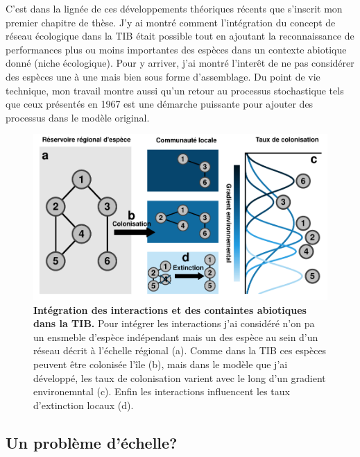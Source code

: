 C'est dans la lignée de ces développements théoriques récents que
s'inscrit mon premier chapitre de thèse. J'y ai montré comment
l'intégration du concept de réseau écologique dans la TIB était possible
tout en ajoutant la reconnaissance de performances plus ou moins
importantes des espèces dans un contexte abiotique donné (niche
écologique). Pour y arriver, j'ai montré l'interêt de ne pas considérer
des espèces une à une mais bien sous forme d'assemblage. Du point de vie
technique, mon travail montre aussi qu'un retour au processus
stochastique tels que ceux présentés en 1967 est une démarche puissante
pour ajouter des processus dans le modèle original.

\begin{figure}[htbp]
\centering
\includegraphics{fig/fig2.pdf}
\caption{\textbf{Intégration des interactions et des containtes
abiotiques dans la TIB.} Pour intégrer les interactions j'ai considéré
n'on pa un ensmeble d'espèce indépendant mais un des espèce au sein d'un
réseau décrit à l'échelle régional (a). Comme dans la TIB ces espèces
peuvent être colonisée l'île (b), mais dans le modèle que j'ai
développé, les taux de colonisation varient avec le long d'un gradient
environemntal (c). Enfin les interactions influencent les taux
d'extinction locaux (d).\label{fig:figGTIB}}
\end{figure}

\subsection*{Un problème d'échelle?}\label{un-probluxe8me-duxe9chelle}

